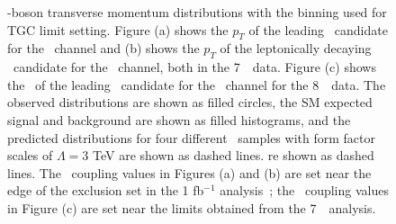 \begin{figure}[htbp]
\begin{center}
\caption[\Z-boson transverse momentum distributions with the binning used for
TGC limit setting.]
{\Z-boson transverse momentum distributions with the binning used for
TGC limit setting.
Figure (a) shows the $p_T$ of the leading \Z\ candidate for the \ZZllll\ channel and (b) shows
the $p_T$ of the leptonically decaying \Z\ candidate for the \ZZllvv\ channel, both in the
7~\tev\ data. Figure (c) shows the \pt\ of the leading \Z\ candidate for the \ZZllll\ channel
for the 8~\tev\ data.
The observed distributions are shown as filled circles,
the SM expected signal and background are shown as filled histograms, and the
predicted distributions for four different \TGC\ samples with form factor
 scales of $\Lambda=3$ TeV are shown as dashed lines.
re shown as dashed lines. The \TGC\ coupling values in Figures (a) and (b) are 
 set near the edge of the exclusion set in the 1 fb$^{-1}$
 analysis~\cite{ATLAS_ZZ4l:1fb2011}; the \TGC\ coupling values in Figure (c) are
 set near the limits obtained from the 7~\tev\ analysis.}
\label{fig:tgc-nicePlot}
\end{center}
\end{figure}

